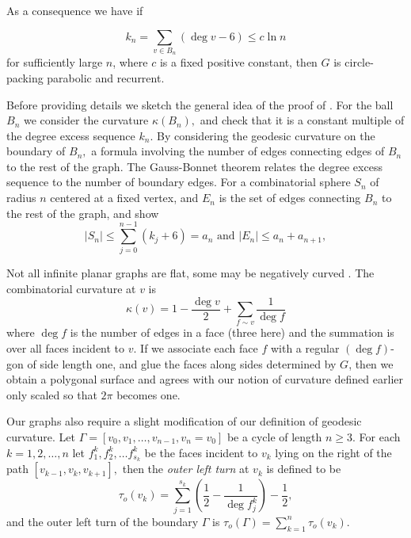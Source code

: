 As a consequence we have if

$$k_n=\sum_{v\in B_n}(\deg v -6)\leq c\ln n$$
for sufficiently large $n$, where $c$ is a fixed positive constant,
then $G$ is circle-packing parabolic and recurrent.

Before providing details we sketch the general idea of the proof of .
For the ball $B_n$ we consider the curvature $\kappa(B_n),$ 
and check that it is a constant multiple of the degree excess sequence $k_n.$
By considering the geodesic curvature on the boundary of $B_n,$ 
a formula involving the number of edges connecting edges of $B_n$
to the rest of the graph.
The Gauss-Bonnet theorem relates the degree excess sequence to
the number of boundary edges. For a combinatorial sphere
$S_n$ of radius $n$ centered at a fixed vertex, and $E_n$ is the set of edges
connecting $B_n$ to the rest of the graph, and show
$$|S_n|\leq \sum_{j=0}^{n-1}(k_j+6)=a_n \text{ and } |E_n|\leq a_n + a_{n+1},$$


Not all infinite planar graphs are flat, some may be negatively curved \cite{higuchi_combinatorial_2001}.
The combinatorial curvature at $v$ is
\begin{equation}\label{eqn:combinatorial-curvature}
\kappa(v)=1-\frac{\deg v}{2}+\sum_{f\sim v}\frac{1}{\deg f}
\end{equation}
where $\deg f $ is the number of edges in a face (three here) and
the summation is over all faces incident to $v.$ 
If we associate each face $f$ with a regular $(\deg f)$-gon
of side length one, and glue the faces along sides determined by $G$, then 
we obtain a polygonal surface and 
 agrees with our notion of curvature defined earlier only
scaled so that $2\pi$ becomes one.

Our graphs also require a slight modification of our definition of geodesic curvature.
Let $\Gamma=[v_0,v_1,\ldots, v_{n-1},v_n=v_0]$ be a cycle of length $n\geq 3.$
For each $k=1,2,\ldots, n$ let $f_1^k,f_2^k,\ldots f_{s_k}^k$ be the faces incident to $v_k$
lying on the right of the path $[v_{k-1},v_k,v_{k+1}],$ then the \emph{outer left turn} at $v_k$
is defined to be
\begin{equation}\label{eqn:outer-left}
\tau_o(v_k)=\sum_{j=1}^{s_k}\left(\frac{1}{2}-\frac{1}{\deg f_j^k}\right)-\frac{1}{2},
\end{equation}
and the outer left turn of the boundary $\Gamma$ is $\tau_o(\Gamma)=\sum_{k=1}^n\tau_o(v_k)$.
